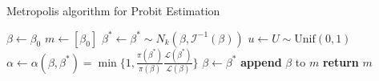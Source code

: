 \documentclass{article}
\begin{document}
\begin{algorithm}
\caption{Metropolis algorithm for Probit Estimation}\label{metropolis}
\begin{algorithmic}[1]
    \State $\beta \gets \beta_0$
    \State $m \gets [\beta_0]$
    \Repeat
        \State $\beta^* \gets \beta^* \sim N_k(\beta,\mathcal{I}^{-1}(\beta))$
        \State $u \gets U \sim \text{Unif}(0, 1)$
        \State $\alpha \gets \alpha(\beta, \beta^*) = \min\big\{1, \frac{\pi(\beta^*)}{\pi(\beta)}\frac{\mathcal{L}(\beta^*)}{\mathcal{L}(\beta)}\big\}$
            \State $\beta \gets \beta^*$
        \EndIf
        \State \textbf{append} $\beta$ to $m$
    \State \textbf{return} $m$
\EndProcedure
\end{algorithmic}
\end{algorithm}
\end{document}
